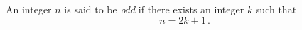 \guard


\begin{defn}
\label{defn:odd}
  An integer $n$ is said to be \emph{odd} if there exists an integer $k$ such that \[ n = 2 k + 1\,.\]
\end{defn}
